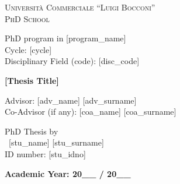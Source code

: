 \begin{titlepage}
  \Large  %
  \begin{center}
    {\LARGE \textsc{Università Commerciale ``Luigi Bocconi''} } \\
    {\LARGE \textsc{PhD School} }

    \vspace{1.5cm}

    \begin{raggedright}
      PhD program in [program\_name] \\
      Cycle: [cycle] \\
      Disciplinary Field (code): [disc\_code] \\
    \end{raggedright}

    \vfill

    {\Huge \textbf{[Thesis Title]}}

    \vfill

    \begin{raggedright}
      Advisor: [adv\_name] [adv\_surname] \\
      Co-Advisor (if any): [coa\_name] [coa\_surname] \\
    \end{raggedright}

    \vspace{1.5cm}

    \begin{raggedleft}
      PhD Thesis by \\
      ~[stu\_name] [stu\_surname] \\
      ID number: [stu\_idno] \\
    \end{raggedleft}

    \vfill

    \textbf{Academic Year: 20\_\_ / 20\_\_}
  \end{center}
\end{titlepage}
